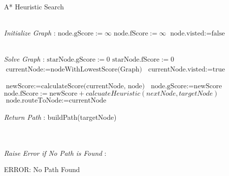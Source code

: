 \label{A*}
\begin{algorithm}
  \caption{A* Heuristic Search}
  \begin{algorithmic}[1]
  \renewcommand{\algorithmicrequire}{\textbf{Input: Graph, startNode, targetNode}}
  \renewcommand{\algorithmicensure}{\textbf{Output: Path}}
  \\ \textit{Initialize Graph} :
    \STATE $\text{node.gScore} := \infty$
    \STATE $\text{node.fScore} := \infty$
    \STATE $\text{node.visted} := \text{false}$
   \ENDFOR

   \\ \textit{Solve Graph} :
   \STATE $\text{starNode.gScore} := 0$
   \STATE $\text{starNode.fScore} := 0$
  \STATE $\text{currentNode} := \text{nodeWithLowestScore(Graph)}$
  \STATE $\text{currentNode.visted} := \text{true}$

    \STATE $\text{newScore} := \text{calculateScore(currentNode, node)}$
    \STATE  $\text{node.gScore} := \text{newScore}$
    \STATE  $\text{node.fScore} := \text{newScore} + calcuateHeuristic(nextNode, targetNode)$
    \STATE  $\text{node.routeToNode} := \text{currentNode}$
    \ENDIF
    \ENDIF
    \ENDFOR
    \\
    \\ \textit{Return Path} :
    \RETURN build{Path(targetNode)}
    \ENDIF

    \\
    \\ \textit{Raise Error if No Path is Found} :

    \RETURN ERROR: No Path Found
    \ENDIF

   \ENDWHILE

  \end{algorithmic} 
  \end{algorithm}